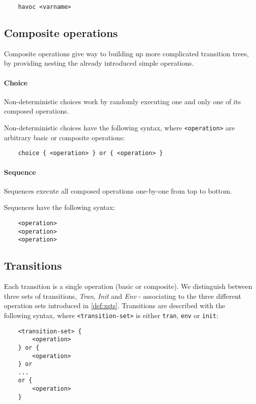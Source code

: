 \begin{lstlisting}
	havoc <varname>
\end{lstlisting}

\subsection{Composite operations}

Composite operations give way to building up more complicated transition trees, by providing nesting the already introduced simple operations.

\paragraph{Choice}

Non-deterministic choices work by randomly executing one and only one of its composed operations.

Non-deterministic choices have the following syntax, where \verb|<operation>| are arbitrary basic or composite operations:

\begin{lstlisting}
	choice { <operation> } or { <operation> }
\end{lstlisting}

\paragraph{Sequence}

Sequences execute all composed operations one-by-one from top to bottom.

Sequences have the following syntax:

\begin{lstlisting}
	<operation>
	<operation>
	<operation>
\end{lstlisting}

\subsection{Transitions}

Each transition is a single operation (basic or composite). We distinguish between three sets of transitions, \emph{Tran}, \emph{Init} and \emph{Env} - associating to the three different operation sets introduced in \autoref{def:xsts}. Transitions are described with the following syntax, where \verb|<transition-set>| is either \verb|tran|, \verb|env| or \verb|init|:

\begin{lstlisting}
	<transition-set> {
		<operation>
	} or {
		<operation>
	} or
	...
	or {
		<operation>
	}
	
\end{lstlisting}
